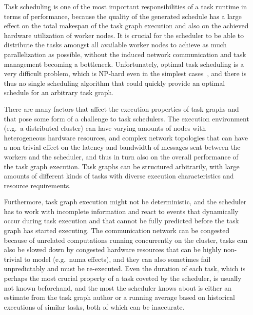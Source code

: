 
Task scheduling is one of the most important responsibilities of a task runtime in terms of
performance, because the quality of the generated schedule has a large effect on the total makespan
of the task graph execution and also on the achieved hardware utilization of worker nodes. It is
crucial for the scheduler to be able to distribute the tasks amongst all available worker nodes to
achieve as much parallelization as possible, without the induced network communication and task
management becoming a bottleneck. Unfortunately, optimal task scheduling is a very difficult
problem, which is NP-hard even in the simplest cases~\cite{Ullman1975}, and there is thus no
single scheduling algorithm that could quickly provide an optimal schedule for an arbitrary task
graph.

There are many factors that affect the execution properties of task graphs and that pose some form
of a challenge to task schedulers. The execution environment (e.g.\ a distributed cluster) can have
varying amounts of nodes with heterogeneous hardware resources, and complex network topologies that
can have a non-trivial effect on the latency and bandwidth of messages sent between the workers and
the scheduler, and thus in turn also on the overall performance of the task graph execution. Task
graphs can be structured arbitrarily, with large amounts of different kinds of tasks with diverse
execution characteristics and resource requirements.

Furthermore, task graph execution might not be deterministic, and the scheduler has to work with
incomplete information and react to events that dynamically occur during task execution and that
cannot be fully predicted before the task graph has started executing. The communication network
can be congested because of unrelated computations running concurrently on the cluster, tasks can
also be slowed down by congested hardware resources that can be highly non-trivial to model (e.g.\
\gls{numa} effects), and they can also sometimes fail unpredictably and must be
re-executed. Even the duration of each task, which is perhaps the most crucial property of a task
coveted by the scheduler, is usually not known beforehand, and the most the scheduler knows about
is either an estimate from the task graph author or a running average based on historical
executions of similar tasks, both of which can be inaccurate.

